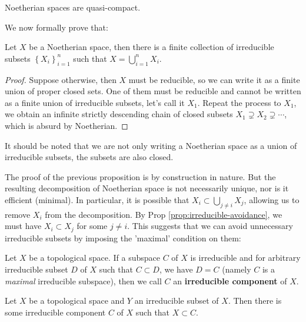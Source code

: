 \documentclass{note-eng}
\begin{document}
\begin{corollary}
    Noetherian spaces are quasi-compact.
\end{corollary}

We now formally prove that:

\begin{proposition}\label{prop:Noetherian-finite-union}
    Let $X$ be a Noetherian space, then there is a finite collection of irreducible subsets $\left\lbrace X_i \right\rbrace_{i = 1}^n$ such that $X = \bigcup\limits_{i = 1}^{n} X_i$.
\end{proposition}

\begin{proof}
    Suppose otherwise, then $X$ must be reducible, so we can write it as a finite union of proper closed sets. One of them must be reducible and cannot be written as a finite union of irreducible subsets, let's call it $X_1$. Repeat the process to $X_1$, we obtain an infinite strictly descending chain of closed subsets $X_1 \supsetneq X_2 \supsetneq \cdots$, which is absurd by Noetherian.
\end{proof}

It should be noted that we are not only writing a Noetherian space as a union of irreducible subsets, the subsets are also closed.

The proof of the previous proposition is by construction in nature. But the resulting decomposition of Noetherian space is not necessarily unique, nor is it efficient (minimal). In particular, it is possible that $X_i \subset \bigcup\limits_{j \ne i}X_j$, allowing us to remove $X_i$ from the decomposition. By Prop \ref{prop:irreducible-avoidance}, we must have $X_i \subset X_j$ for some $j \ne i$. This suggests that we can avoid unnecessary irreducible subsets by imposing the 'maximal' condition on them:

\begin{definition}
    Let $X$ be a topological space. If a subspace $C$ of $X$ is irreducible and for arbitrary irreducible subset $D$ of $X$ such that $C \subset D$, we have $D = C$ (namely $C$ is a \textit{maximal} irreducible subspace), then we call $C$ an \textbf{irreducible component} of $X$.
\end{definition}

\begin{proposition}\label{prop:maximal-irreducible}
    Let $X$ be a topological space and $Y$ an irreducible subset of $X$. Then there is some irreducible component $C$ of $X$ such that $X \subset C$.
\end{proposition}
\end{document}
